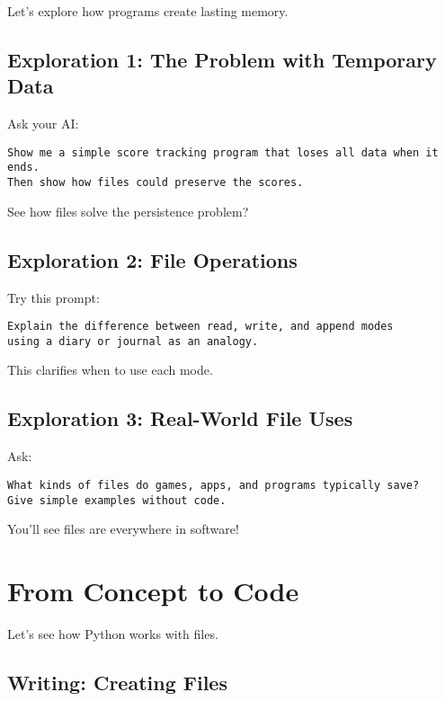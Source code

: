 \documentclass[
  letterpaper,
  DIV=11,
  numbers=noendperiod,
  oneside]{scrreprt}
\begin{document}
Let's explore how programs create lasting memory.

\subsection{Exploration 1: The Problem with Temporary
Data}\label{exploration-1-the-problem-with-temporary-data}

Ask your AI:

\begin{verbatim}
Show me a simple score tracking program that loses all data when it ends. 
Then show how files could preserve the scores.
\end{verbatim}

See how files solve the persistence problem?

\subsection{Exploration 2: File
Operations}\label{exploration-2-file-operations}

Try this prompt:

\begin{verbatim}
Explain the difference between read, write, and append modes 
using a diary or journal as an analogy.
\end{verbatim}

This clarifies when to use each mode.

\subsection{Exploration 3: Real-World File
Uses}\label{exploration-3-real-world-file-uses}

Ask:

\begin{verbatim}
What kinds of files do games, apps, and programs typically save? 
Give simple examples without code.
\end{verbatim}

You'll see files are everywhere in software!

\section{From Concept to Code}\label{from-concept-to-code-7}

Let's see how Python works with files.

\subsection{Writing: Creating Files}\label{writing-creating-files}
\end{document}
